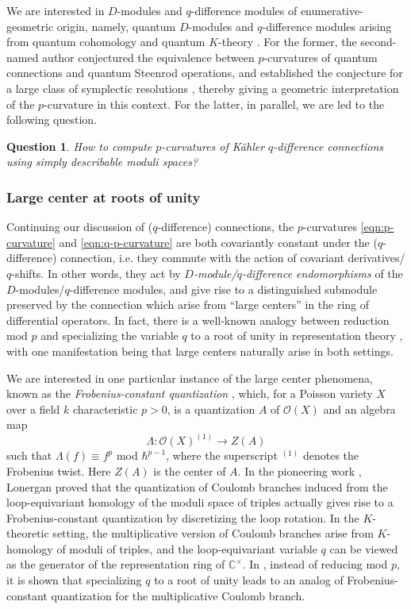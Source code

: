 \documentclass[reqno]{amsart}
\numberwithin{equation}{section}
\numberwithin{equation}{section}
\numberwithin{equation}{section}
\newtheorem{ques}[thm]{Question}
\theoremstyle{definition}
\theoremstyle{remark}
\theoremstyle{remark}
\begin{document}
We are interested in $D$-modules and $q$-difference modules of enumerative-geometric origin, namely, quantum $D$-modules and $q$-difference modules arising from quantum cohomology and quantum $K$-theory \cite{MO19, Oko17}. For the former, the second-named author conjectured the equivalence between $p$-curvatures of quantum connections and quantum Steenrod operations, and established the conjecture for a large class of symplectic resolutions \cite{Lee23b}, thereby giving a geometric interpretation of the $p$-curvature in this context. For the latter, in parallel, we are led to the following question.
\begin{ques}
    How to compute $p$-curvatures of K\"ahler $q$-difference connections using simply describable moduli spaces?
\end{ques}

\subsubsection{Large center at roots of unity}
Continuing our discussion of ($q$-difference) connections, the $p$-curvatures \eqref{eqn:p-curvature} and \eqref{eqn:q-p-curvature} are both covariantly constant under the ($q$-difference) connection, i.e. they commute with the action of covariant derivatives/$q$-shifts. In other words, they act by \emph{$D$-module/$q$-difference endomorphisms} of the $D$-modules/$q$-difference modules, and give rise to a distinguished submodule preserved by the connection which arise from ``large centers'' in the ring of differential operators. In fact, there is a well-known analogy between reduction mod $p$ and specializing the variable $q$ to a root of unity in representation theory \cite{zbMATH00596170}, with one manifestation being that large centers naturally arise in both settings.

We are interested in one particular instance of the large center phenomena, known as the \emph{Frobenius-constant quantization} \cite{bezrukavnikov-kaledin-quantp}, which, for a Poisson variety $X$ over a field $k$ characteristic $p > 0$, is a quantization $A$ of $\mathcal{O}(X)$ and an algebra map
    \begin{equation}
        \Lambda : \mathcal{O}(X)^{(1)} \to Z (A)
    \end{equation}
such that $\Lambda(f) \equiv f^p$ mod $\hbar^{p-1}$, where the superscript ${}^{(1)}$ denotes the Frobenius twist. Here $Z(A)$ is the center of $A$. In the pioneering work \cite[Section 4]{lonergan}, Lonergan proved that the quantization of Coulomb branches \cite{BFN2} induced from the loop-equivariant homology of the moduli space of triples actually gives rise to a Frobenius-constant quantization by discretizing the loop rotation. In the $K$-theoretic setting, the multiplicative version of Coulomb branches arise from $K$-homology of moduli of triples, and the loop-equivariant variable $q$ can be viewed as the generator of the representation ring of $\mathbb{C}^{\times}$. In \cite[Section 4]{lonergan}, instead of reducing mod $p$, it is shown that specializing $q$ to a root of unity leads to an analog of Frobenius-constant quantization for the multiplicative Coulomb branch.
\end{document}
